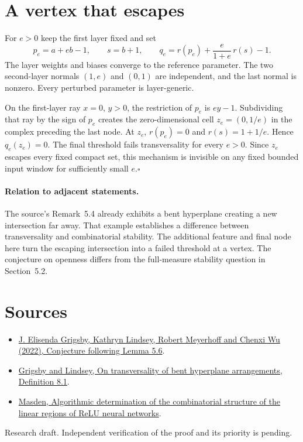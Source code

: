\documentclass[11pt]{article}
\begin{document}
\section*{A vertex that escapes}
For $e>0$ keep the first layer fixed and set
\[
 p_e=a+eb-1,\qquad s=b+1,\qquad
 q_e=r(p_e)+\frac{e}{1+e}\,r(s)-1.
\]
The layer weights and biases converge to the reference parameter. The two second-layer normals $(1,e)$ and $(0,1)$ are independent, and the last normal is nonzero. Every perturbed parameter is layer-generic.

On the first-layer ray $x=0$, $y>0$, the restriction of $p_e$ is $ey-1$. Subdividing that ray by the sign of $p_e$ creates the zero-dimensional cell $z_e=(0,1/e)$ in the complex preceding the last node. At $z_e$, $r(p_e)=0$ and $r(s)=1+1/e$. Hence $q_e(z_e)=0$. The final threshold fails transversality for every $e>0$. Since $z_e$ escapes every fixed compact set, this mechanism is invisible on any fixed bounded input window for sufficiently small $e$.\hfill$\square$

\paragraph{Relation to adjacent statements.} The source's Remark~5.4 already exhibits a bent hyperplane creating a new intersection far away. That example establishes a difference between transversality and combinatorial stability. The additional feature and final node here turn the escaping intersection into a failed threshold at a vertex. The conjecture on openness differs from the full-measure stability question in Section~5.2.

\section*{Sources}
\begin{itemize}
\item \href{https://arxiv.org/abs/2209.04036}{J. Elisenda Grigsby, Kathryn Lindsey, Robert Meyerhoff and Chenxi Wu (2022), Conjecture following Lemma 5.6}.
\item \href{https://arxiv.org/abs/2008.09052}{Grigsby and Lindsey, On transversality of bent hyperplane arrangements, Definition 8.1}.
\item \href{https://arxiv.org/abs/2207.07696}{Masden, Algorithmic determination of the combinatorial structure of the linear regions of ReLU neural networks}.
\end{itemize}
{\small Research draft. Independent verification of the proof and its priority is pending.}
\end{document}
